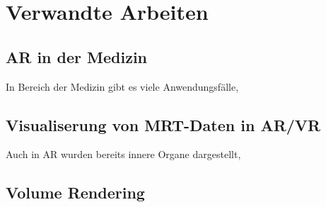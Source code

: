 
\chapter{Verwandte Arbeiten}
\label{related}

\section{AR in der Medizin}

In Bereich der Medizin gibt es viele Anwendungsfälle, 

\section{Visualiserung von MRT-Daten in AR/VR}

Auch in AR wurden bereits innere Organe dargestellt, 


\section{Volume Rendering}
